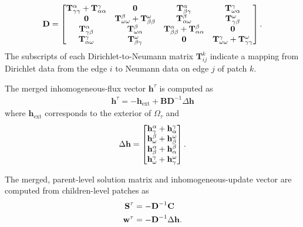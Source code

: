 \begin{align}
    \textbf{D} = 
    \begin{bmatrix}
        \mathbf T^{\alpha}_{\gamma\gamma} + \mathbf T^{\gamma}_{\alpha\alpha} 
        & \mathbf 0 
        & \mathbf T^{\alpha}_{\beta\gamma} 
        & \mathbf T^{\gamma}_{\omega\alpha} \\
        \mathbf 0 
        & \mathbf T^{\beta}_{\omega\omega} + \mathbf T^{\omega}_{\beta\beta} 
        & \mathbf T^{\beta}_{\alpha\omega} 
        & \mathbf T^{\omega}_{\gamma\beta} \\
        \mathbf T^{\alpha}_{\gamma\beta} 
        & \mathbf T^{\beta}_{\omega\alpha} 
        & \mathbf T^{\alpha}_{\beta\beta}+ \mathbf T^{\beta}_{\alpha\alpha} 
        & \mathbf 0 \\
        \mathbf T^{\gamma}_{\alpha\omega} 
        & \mathbf T^{\omega}_{\beta\gamma} 
        & \mathbf 0 
        & \mathbf T^{\gamma}_{\omega\omega} + \mathbf T^{\omega}_{\gamma\gamma}
    \end{bmatrix}
    \label{eq:matrix_D}.
\end{align}
The subscripts of each Dirichlet-to-Neumann matrix $\textbf{T}^{k}_{ij}$ indicate a mapping from Dirichlet data from the edge $i$ to Neumann data on edge $j$ of patch $k$.

The merged inhomogeneous-flux vector $\textbf{h}^{\tau}$ is computed as
\begin{align}
    \textbf{h}^{\tau} = -\textbf{h}_{\text{ext}} + \textbf{B} \textbf{D}^{-1} \Delta \textbf{h}
    \label{eq:h-merged}
\end{align}
where $\textbf{h}_{\text{ext}}$ corresponds to the exterior of $\Omega_{\tau}$ and
\begin{align}
    \Delta \mathbf h = 
    \begin{bmatrix}
        \mathbf h^{\alpha}_{\gamma} + \mathbf h^{\gamma}_{\alpha} \\
        \mathbf h^{\beta}_{\omega} + \mathbf h^{\omega}_{\beta} \\
        \mathbf h^{\alpha}_{\beta} + \mathbf h^{\beta}_{\alpha} \\
        \mathbf h^{\gamma}_{\omega} + \mathbf h^{\omega}_{\gamma}
    \end{bmatrix}.
    \label{eq:delta_h}
\end{align}

The merged, parent-level solution matrix and inhomogeneous-update vector are computed from children-level patches as
\begin{align}
    \textbf{S}^{\tau} &= -\textbf{D}^{-1} \textbf{C}
    \label{eq:S-merged} \\
    \textbf{w}^{\tau} &= -\textbf{D}^{-1} \Delta \mathbf h.
    \label{eq:w-merged}
\end{align}

